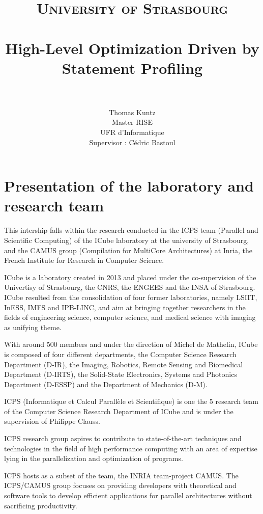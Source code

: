 \documentclass[paper=a4, fontsize=11.5pt]{scrartcl}
\title{
        \usefont{OT1}{bch}{b}{n}
        \normalfont \normalsize \textsc{University of Strasbourg} \\ [25pt]
        \horrule{0.5pt} \\[0.4cm]
        \huge High-Level Optimization Driven by Statement Profiling \\
        \horrule{2pt} \\[0.5cm]
}
\author{
        \normalfont                                 \Large
        Thomas Kuntz \\                                \normalsize
        Master RISE \\                                \normalsize
        UFR d'Informatique \\                                \normalsize
        Supervisor : Cédric Bastoul\\
}
\date{}
\numberwithin{equation}{section}        %
\numberwithin{figure}{section}          %
\numberwithin{table}{section}               %
\begin{document}

\maketitle
\thispagestyle{empty}

\clearpage

\tableofcontents
\clearpage

\section{Presentation of the laboratory and research team}
This intership falls within the research conducted in the ICPS team (Parallel and Scientific
Computing) of the ICube laboratory at the university of Strasbourg, and the CAMUS group
(Compilation for MultiCore Architectures) at Inria, the French Institute for Research
in Computer Science.

\bigskip

ICube is a laboratory created in 2013 and placed under the co-supervision of the Univertisy of
Strasbourg, the CNRS, the ENGEES and the INSA of Strasbourg.
ICube resulted from the consolidation of four former laboratories, namely LSIIT, InESS, IMFS and IPB-LINC,
and aim at bringing together researchers in the fields of engineering science, computer science,
and medical science with imaging as unifying theme.

With around 500 members and under the direction of Michel de Mathelin, ICube is composed of
four different departments, the Computer Science Research Department (D-IR), the
Imaging, Robotics, Remote Sensing and Biomedical Department (D-IRTS), the 
Solid-State Electronics, Systems and Photonics Department (D-ESSP) and the 
Department of Mechanics (D-M).

\bigskip

ICPS (Informatique et Calcul Parallèle et Scientifique)
is one the 5 research team of the Computer Science Research Department of ICube and is
under the supervision of Philippe Clauss.

ICPS research group aspires to contribute to state-of-the-art techniques and
technologies in the field of high performance computing with an area of expertise lying
in the parallelization and optimization of programs.

ICPS hosts as a subset of the team, the INRIA team-project CAMUS.
The ICPS/CAMUS group focuses on providing developers with theoretical and software
tools to develop efficient applications for parallel architectures without sacrificing
productivity.
\end{document}
